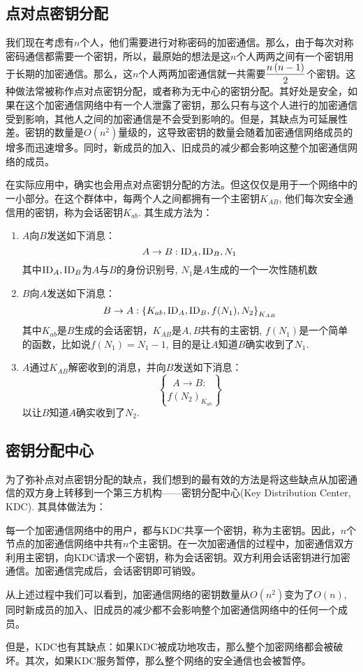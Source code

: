 \subsection{点对点密钥分配}
我们现在考虑有$n$个人，他们需要进行对称密码的加密通信。那么，由于每次对称密码通信都需要一个密钥，所以，最原始的想法是这$n$个人两两之间有一个密钥用于长期的加密通信。那么，这$n$个人两两加密通信就一共需要$\displaystyle\frac{n\left( {n-1}\right)}{2}$个密钥。这种做法常被称作点对点密钥分配，或者称为无中心的密钥分配。其好处是安全，如果在这个加密通信网络中有一个人泄露了密钥，那么只有与这个人进行的加密通信受到影响，其他人之间的加密通信是不会受到影响的。但是，其缺点为可延展性差。密钥的数量是$O(n^2)$量级的，这导致密钥的数量会随着加密通信网络成员的增多而迅速增多。同时，新成员的加入、旧成员的减少都会影响这整个加密通信网络的成员。\par
在实际应用中，确实也会用点对点密钥分配的方法。但这仅仅是用于一个网络中的一小部分。在这个群体中，每两个人之间都拥有一个主密钥$K_{AB}$, 他们每次安全通信用的密钥，称为会话密钥$K_{ab}$. 其生成方法为：
\begin{enumerate}
	\item $A$向$B$发送如下消息：
	\[A\to B: \mathrm{ID}_A, \mathrm{ID}_B, N_1\]
	其中$\mathrm{ID}_A, \mathrm{ID}_B$为$A$与$B$的身份识别号, $N_1$是$A$生成的一个一次性随机数
	\item $B$向$A$发送如下消息：
	\[B\to A: \left\{ {K_{ab}, \mathrm{ID}_A, \mathrm{ID}_B, f(N_1), N_2} \right\}_{K_{AB}}\]
	其中$K_{ab}$是$B$生成的会话密钥，$K_{AB}$是$A, B$共有的主密钥, $f(N_1)$是一个简单的函数，比如说$f(N_1)=N_1-1$, 目的是让$A$知道$B$确实收到了$N_1$.
	\item $A$通过$K_{AB}$解密收到的消息，并向$B$发送如下消息：
	\[A\to B:\brace{f(N_2)}_{K_{ab}}\]
	以让$B$知道$A$确实收到了$N_2$.
\end{enumerate}
\subsection{密钥分配中心}
为了弥补点对点密钥分配的缺点，我们想到的最有效的方法是将这些缺点从加密通信的双方身上转移到一个第三方机构——密钥分配中心(Key Distribution Center, KDC). 其具体做法为：\par
每一个加密通信网络中的用户，都与KDC共享一个密钥，称为主密钥。因此，$n$个节点的加密通信网络中共有$n$个主密钥。在一次加密通信的过程中，加密通信双方利用主密钥，向KDC请求一个密钥，称为会话密钥。双方利用会话密钥进行加密通信。加密通信完成后，会话密钥即可销毁。\par
从上述过程中我们可以看到，加密通信网络的密钥数量从$O(n^2)$变为了$O(n)$, 同时新成员的加入、旧成员的减少都不会影响整个加密通信网络中的任何一个成员。\par
但是，KDC也有其缺点：如果KDC被成功地攻击，那么整个加密网络都会被破坏。其次，如果KDC服务暂停，那么整个网络的安全通信也会被暂停。
